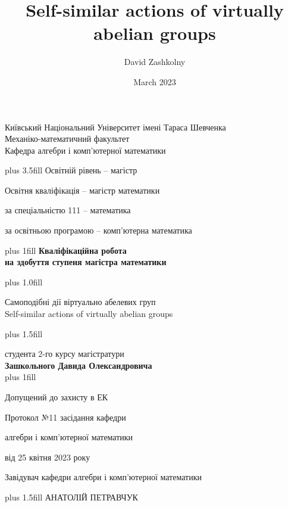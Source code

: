 \documentclass[a4paper,12pt]{amsart}
\title{ 	Self-similar actions of virtually abelian groups }
\author{ David Zashkolny }
\date{March 2023}
\theoremstyle{definition}
\begin{document}
	
	
	
	\thispagestyle {empty}
	\begin{center}
		\large  Київський Національний Університет імені Тараса Шевченка \\
		Механіко-математичний факультет \\
		Кафедра алгебри і комп'ютерної математики \par
	\end{center}
	
	\vskip0cm plus 3.5fill
	Освітній рівень -- магістр	
	
	Освітня кваліфікація -- магістр математики 
	
	за спеціальністю 111 -- математика 
	
	за освітньою програмою -- комп'ютерна математика 
	
	
	\begin{center}
		\vskip0cm plus 1fill
		\vspace{2.5cm} {\bf Кваліфікаційна робота}\\
		
		{\bf на здобуття ступеня магістра математики}\\
	\end{center}
	
	
	\vskip0cm plus 1.0fill

	
	
	\begin{center}\bf
		{\LARGE
			Самоподібні дії віртуально абелевих груп\\
			\vskip0.5cm
			Self-similar actions of virtually abelian groups 
			\par}
	\end{center}
	
	\vskip0cm plus 1.5fill
	
	\hangindent=7cm  \noindent
	студента 2-го курсу магістратури\\
	{\bf Зашкольного Давида Олександровича}\\
	
	
	\vskip0cm plus 1fill
	
	Допущений до захисту в ЕК
	
	Протокол №11 засідання кафедри 
	
	алгебри і комп'ютерної математики 
	
	від 25 квітня 2023 року 
	
	Завідувач кафедри алгебри і комп'ютерної математики 
	
	\begin{center}
		
		\vskip0cm plus 1.5fill
		АНАТОЛІЙ ПЕТРАВЧУК
	\end{center}
	
\end{document}
